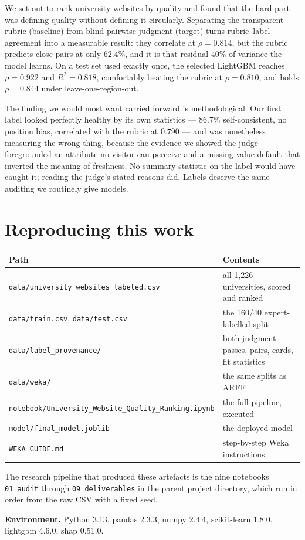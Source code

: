 \documentclass[11pt,a4paper]{article}
\begin{document}
We set out to rank university websites by quality and found that the hard part was defining
quality without defining it circularly. Separating the transparent rubric (baseline) from
blind pairwise judgment (target) turns rubric--label agreement into a measurable result: they
correlate at $\rho = 0.814$, but the rubric predicts close pairs at only $62.4\%$, and it is
that residual $40\%$ of variance the model learns. On a test set used exactly once, the
selected LightGBM reaches $\rho = 0.922$ and $R^2 = 0.818$, comfortably beating the rubric at
$\rho = 0.810$, and holds $\rho = 0.844$ under leave-one-region-out.

The finding we would most want carried forward is methodological. Our first label looked
perfectly healthy by its own statistics --- $86.7\%$ self-consistent, no position bias,
correlated with the rubric at $0.790$ --- and was nonetheless measuring the wrong thing,
because the evidence we showed the judge foregrounded an attribute no visitor can perceive and
a missing-value default that inverted the meaning of freshness. No summary statistic on the
label would have caught it; reading the judge's stated reasons did. Labels deserve the same
auditing we routinely give models.

\appendix
\section{Reproducing this work}

\begin{table}[H]\centering\small
\begin{tabular}{ll}
\toprule
\textbf{Path} & \textbf{Contents} \\
\midrule
\texttt{data/university\_websites\_labeled.csv} & all 1{,}226 universities, scored and ranked \\
\texttt{data/train.csv}, \texttt{data/test.csv} & the 160/40 expert-labelled split \\
\texttt{data/label\_provenance/} & both judgment passes, pairs, cards, fit statistics \\
\texttt{data/weka/} & the same splits as ARFF \\
\texttt{notebook/University\_Website\_Quality\_Ranking.ipynb} & the full pipeline, executed \\
\texttt{model/final\_model.joblib} & the deployed model \\
\texttt{WEKA\_GUIDE.md} & step-by-step Weka instructions \\
\bottomrule
\end{tabular}
\end{table}

\noindent The research pipeline that produced these artefacts is the nine notebooks
\texttt{01\_audit} through \texttt{09\_deliverables} in the parent project directory, which run
in order from the raw CSV with a fixed seed.

\vspace{6pt}
\noindent\textbf{Environment.} Python 3.13, pandas 2.3.3, numpy 2.4.4, scikit-learn 1.8.0,
lightgbm 4.6.0, shap 0.51.0.
\end{document}
